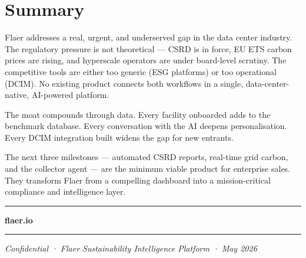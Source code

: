 \documentclass[11pt, a4paper]{article}
\begin{document}
\section{Summary}

Flaer addresses a real, urgent, and underserved gap in the data center industry. The regulatory pressure is not theoretical — CSRD is in force, EU ETS carbon prices are rising, and hyperscale operators are under board-level scrutiny. The competitive tools are either too generic (ESG platforms) or too operational (DCIM). No existing product connects both workflows in a single, data-center-native, AI-powered platform.

The moat compounds through data. Every facility onboarded adds to the benchmark database. Every conversation with the AI deepens personalisation. Every DCIM integration built widens the gap for new entrants.

The next three milestones — automated CSRD reports, real-time grid carbon, and the collector agent — are the minimum viable product for enterprise sales. They transform Flaer from a compelling dashboard into a mission-critical compliance and intelligence layer.

\vspace{1cm}
\begin{center}
\color{flaergreen}
\rule{4cm}{0.4pt} \quad \textbf{flaer.io} \quad \rule{4cm}{0.4pt}
\end{center}

\vspace{0.3cm}
\begin{center}
\small\color{flaergray}
\textit{Confidential · Flaer Sustainability Intelligence Platform · May 2026}
\end{center}
\end{document}
